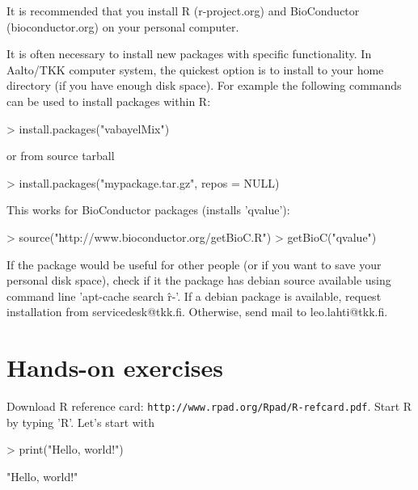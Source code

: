 \documentclass[10pt,a4paper]{article}
\begin{document}
It is recommended that you install R (r-project.org) and BioConductor
(bioconductor.org) on your personal computer. 

It is often necessary to install new packages with specific
functionality. In Aalto/TKK computer system, the quickest option is to
install to your home directory (if you have enough disk space). For
example the following commands can be used to install packages within
R:

\begin{Schunk}
\begin{Sinput}
> install.packages("vabayelMix")
\end{Sinput}
\end{Schunk}

or from source tarball
\begin{Schunk}
\begin{Sinput}
> install.packages("mypackage.tar.gz", repos = NULL)
\end{Sinput}
\end{Schunk}

This works for BioConductor packages (installs 'qvalue'):
\begin{Schunk}
\begin{Sinput}
> source("http://www.bioconductor.org/getBioC.R")
> getBioC("qvalue")
\end{Sinput}
\end{Schunk}


If the package would be useful for other people (or if you want to
save your personal disk space), check if it the package has debian
source available using command line 'apt-cache search \^r-'. If a
debian package is available, request installation from
servicedesk@tkk.fi. Otherwise, send mail to leo.lahti@tkk.fi.


\section{Hands-on exercises}


Download R reference card:
\texttt{http://www.rpad.org/Rpad/R-refcard.pdf}. Start R by typing
'R'. Let's start with

\begin{Schunk}
\begin{Sinput}
> print("Hello, world!")
\end{Sinput}
\begin{Soutput}
[1] "Hello, world!"
\end{Soutput}
\end{Schunk}
\end{document}

